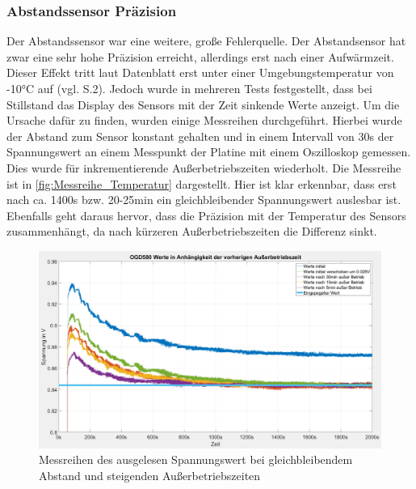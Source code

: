 \subsubsection{Abstandssensor Präzision}
Der Abstandssensor war eine weitere, große Fehlerquelle. Der Abstandsensor hat zwar eine sehr hohe Präzision erreicht, allerdings erst nach einer Aufwärmzeit. Dieser Effekt tritt laut Datenblatt erst unter einer Umgebungstemperatur von -10°C auf (vgl. \cite{OGD580_Datasheet} S.2). Jedoch wurde in mehreren Tests festgestellt, dass bei Stillstand das Display des Sensors mit der Zeit sinkende Werte anzeigt. Um die Ursache dafür zu finden, wurden einige Messreihen durchgeführt. Hierbei wurde der Abstand zum Sensor konstant gehalten und in einem Intervall von 30s der Spannungswert an einem Messpunkt der Platine mit einem Oszilloskop gemessen. Dies wurde für inkrementierende Außerbetriebszeiten wiederholt. Die Messreihe ist in \autoref{fig:Messreihe_Temperatur} dargestellt. Hier ist klar erkennbar, dass erst nach ca. 1400s bzw. 20-25min ein gleichbleibender Spannungswert auslesbar ist. Ebenfalls geht daraus hervor, dass die Präzision mit der Temperatur des Sensors zusammenhängt, da nach kürzeren Außerbetriebszeiten die Differenz sinkt.
\begin{figure}[H]
	\centering
	\includegraphics[width=1.0\textwidth]{images/Hardware/Abstandssensor_plot_highres.PNG}
	\caption{Messreihen des ausgelesen Spannungswert bei gleichbleibendem Abstand und steigenden Außerbetriebszeiten}
	\label{fig:Messreihe_Temperatur}
\end{figure}

